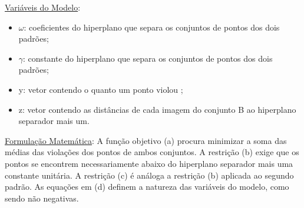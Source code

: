 \underline{Variáveis do Modelo}:
\begin{itemize}
\item{$\omega$}: coeficientes do hiperplano que separa os conjuntos de pontos dos dois padrões;
\item{$\gamma$}: constante do hiperplano que separa os conjuntos de pontos dos dois padrões;
\item{y}: vetor contendo o quanto um ponto violou ;
\item{z}: vetor contendo as distâncias de cada imagem do conjunto B ao hiperplano separador mais um.
\end{itemize}

\underline{Formulação Matemática}:
A função objetivo (a) procura minimizar a soma das médias das violações dos pontos de ambos conjuntos. A restrição (b) exige que os pontos se encontrem necessariamente abaixo do hiperplano separador mais uma constante unitária.  A restrição (c) é análoga a restrição (b) aplicada ao segundo padrão. As equações em (d) definem a natureza das variáveis do modelo, como sendo não negativas.

